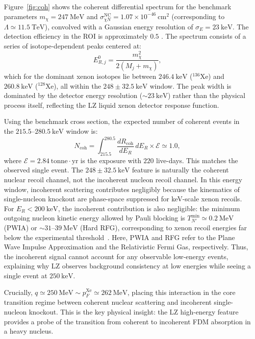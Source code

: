 \documentclass[aps,twocolumn,superscriptaddress,groupedaddress,nofootinbib,floatfix]{revtex4}
\begin{document}
Figure~\ref{fig:coh} shows the coherent differential spectrum for the benchmark parameters $m_\chi=247\ \text{MeV}$ and $\sigma_{\chi N}^{\text{NC}}=1.07\times10^{-46}\ \text{cm}^2$ (corresponding to $\Lambda\simeq11.5\ \text{TeV}$), convolved with a Gaussian energy resolution of $\sigma_E=23\ \text{keV}$. The detection efficiency in the ROI is approximately $0.5$ \cite{LZ2026}. The spectrum consists of a series of isotope-dependent peaks centered at:
\begin{equation}
E_{R,j}^0=\frac{m_\chi^2}{2(M_j+m_\chi)},
\end{equation}
which for the dominant xenon isotopes lie between $246.4\ \text{keV}$ (${}^{136}\text{Xe}$) and $260.8\ \text{keV}$ (${}^{128}\text{Xe}$), all within the $248\pm32.5\ \text{keV}$ window. The peak width is dominated by the detector energy resolution ($\sim23\ \text{keV}$) rather than the physical process itself, reflecting the LZ liquid xenon detector response function.

Using the benchmark cross section, the expected number of coherent events in the $215.5$--$280.5\ \text{keV}$ window is:
\begin{equation}
N_{\text{coh}}=\int_{215.5}^{280.5}
\frac{dR_{\text{coh}}}{dE_R}
\,dE_R
\times\mathcal{E}
\simeq1.0,
\end{equation}
where $\mathcal{E}=2.84\ \text{tonne}\cdot\text{yr}$ is the exposure with $220$ live-days. This matches the observed single event. The $248\pm32.5\ \text{keV}$ feature is naturally the coherent nuclear recoil channel, not the incoherent nucleon recoil channel. In this energy window, incoherent scattering contributes negligibly because the kinematics of single-nucleon knockout are phase-space suppressed for keV-scale xenon recoils. For $E_R<200\ \text{keV}$, the incoherent contribution is also negligible: the minimum outgoing nucleon kinetic energy allowed by Pauli blocking is $T_{N'}^{\min}\simeq0.2\ \text{MeV}$ (PWIA) or $\sim31$--$39\ \text{MeV}$ (Hard RFG), corresponding to xenon recoil energies far below the experimental threshold~\cite{Ge:2024euk}. Here, PWIA and RFG refer to the Plane Wave Impulse Approximation and the Relativistic Fermi Gas, respectively. Thus, the incoherent signal cannot account for any observable low-energy events, explaining why LZ observes background consistency at low energies while seeing a single event at $250\ \text{keV}$.

Crucially, $q\simeq250\ \text{MeV}\sim p_F^{\text{Xe}}\simeq262\ \text{MeV}$, placing this interaction in the core transition regime between coherent nuclear scattering and incoherent single-nucleon knockout. This is the key physical insight: the LZ high-energy feature provides a probe of the transition from coherent to incoherent FDM absorption in a heavy nucleus.
\end{document}
